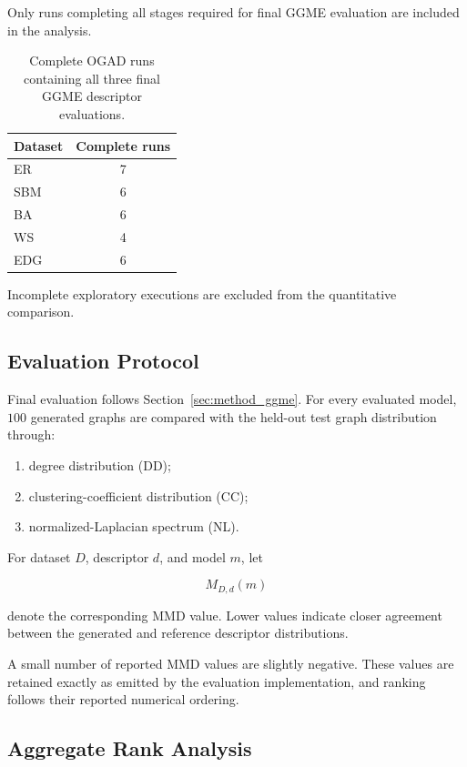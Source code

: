 Only runs completing all stages required for final GGME evaluation are included in the analysis.

\begin{table}[htbp]
    \centering
    \caption{Complete OGAD runs containing all three final GGME descriptor evaluations.}
    \label{tab:exp_complete_runs}
    \begin{tabular}{lc}
        \hline
        Dataset & Complete runs \\
        \hline
        ER  & 7 \\
        SBM & 6 \\
        BA  & 6 \\
        WS  & 4 \\
        EDG & 6 \\
        \hline
    \end{tabular}
\end{table}

Incomplete exploratory executions are excluded from the quantitative comparison.


\subsection{Evaluation Protocol}
\label{subsec:exp_evaluation}

Final evaluation follows Section~\ref{sec:method_ggme}. For every evaluated model, \(100\) generated graphs are compared with the held-out test graph distribution through:

\begin{enumerate}
    \item degree distribution (DD);
    \item clustering-coefficient distribution (CC);
    \item normalized-Laplacian spectrum (NL).
\end{enumerate}

For dataset \(D\), descriptor \(d\), and model \(m\), let

\[
M_{D,d}(m)
\]

denote the corresponding MMD value. Lower values indicate closer agreement between the generated and reference descriptor distributions.

A small number of reported MMD values are slightly negative. These values are retained exactly as emitted by the evaluation implementation, and ranking follows their reported numerical ordering.


\subsection{Aggregate Rank Analysis}
\label{subsec:exp_rank_method}

